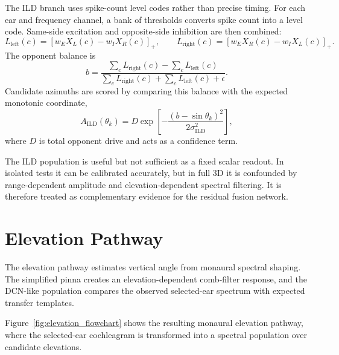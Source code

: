 The ILD branch uses spike-count level codes rather than precise timing. For each ear and frequency channel, a bank of thresholds converts spike count into a level code. Same-side excitation and opposite-side inhibition are then combined:
\begin{equation}
    L_{\mathrm{left}}(c)
    =
    [w_E X_L(c)-w_I X_R(c)]_+,
    \qquad
    L_{\mathrm{right}}(c)
    =
    [w_E X_R(c)-w_I X_L(c)]_+.
\end{equation}
The opponent balance is
\begin{equation}
    b
    =
    \frac{\sum_c L_{\mathrm{right}}(c)-\sum_c L_{\mathrm{left}}(c)}
    {\sum_c L_{\mathrm{right}}(c)+\sum_c L_{\mathrm{left}}(c)+\epsilon}.
\end{equation}
Candidate azimuths are scored by comparing this balance with the expected monotonic coordinate,
\begin{equation}
    A_{\mathrm{ILD}}(\theta_k)
    =
    D\exp
    \left[
    -
    \frac{(b-\sin\theta_k)^2}{2\sigma_{\mathrm{ILD}}^2}
    \right],
\end{equation}
where $D$ is total opponent drive and acts as a confidence term.

The ILD population is useful but not sufficient as a fixed scalar readout. In isolated tests it can be calibrated accurately, but in full 3D it is confounded by range-dependent amplitude and elevation-dependent spectral filtering. It is therefore treated as complementary evidence for the residual fusion network.

\section{Elevation Pathway}

The elevation pathway estimates vertical angle from monaural spectral shaping. The simplified pinna creates an elevation-dependent comb-filter response, and the DCN-like population compares the observed selected-ear spectrum with expected transfer templates.



Figure~\ref{fig:elevation_flowchart} shows the resulting monaural elevation pathway, where the selected-ear cochleagram is transformed into a spectral population over candidate elevations.

